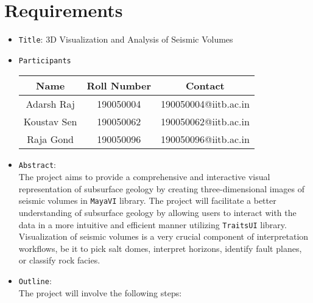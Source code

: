 \documentclass[11pt,a4paper]{article}
\begin{document}
\section*{{\LARGE Requirements}}
\begin{itemize}
    \item \texttt{Title}: 3D Visualization and Analysis of Seismic Volumes
    \item \texttt{Participants}
    
    \begin{center}
         \begin{tabular}{||c | c | c||} 
         \hline
         \textbf{Name} & \textbf{Roll Number} & \textbf{Contact} \\ [0.5ex] 
         \hline \hline 
         Adarsh Raj & 190050004 & 190050004@iitb.ac.in \\ 
         \hline 
         Koustav Sen & 190050062 & 190050062@iitb.ac.in \\
         \hline 
         Raja Gond & 190050096 & 190050096@iitb.ac.in \\
         \hline
        \end{tabular}
    \end{center}
    \item \texttt{Abstract}:\\
    
    The project aims to provide a comprehensive and interactive visual representation of subsurface geology by creating three-dimensional images of seismic volumes in \verb!MayaVI! library. The project will facilitate a better understanding of subsurface geology by allowing users to interact with the data in a more intuitive and efficient manner utilizing \verb!TraitsUI! library. Visualization of seismic volumes  is a very crucial component of interpretation workflows, be it to pick salt domes, interpret horizons, identify fault planes, or classify rock facies. 
    
    \item \texttt{Outline}:\\
    
    The project will involve the following steps:


\end{itemize}
\end{document}
